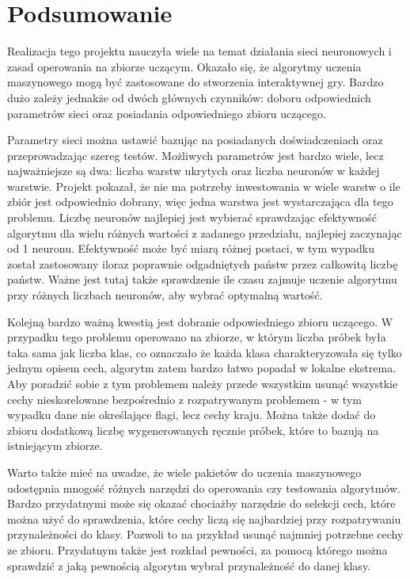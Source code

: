 \chapter{Podsumowanie}

Realizacja tego projektu nauczyła wiele na temat działania sieci neuronowych i zasad operowania na zbiorze uczącym. Okazało się, że algorytmy uczenia maszynowego mogą być zastosowane do stworzenia interaktywnej gry. Bardzo dużo zależy jednakże od dwóch głównych czynników: doboru odpowiednich parametrów sieci oraz posiadania odpowiedniego zbioru uczącego.

Parametry sieci można ustawić bazując na posiadanych doświadczeniach oraz przeprowadzając szereg testów. Możliwych parametrów jest bardzo wiele, lecz najważniejsze są dwa: liczba warstw ukrytych oraz liczba neuronów w każdej warstwie. Projekt pokazał, że nie ma potrzeby inwestowania w wiele warstw o ile zbiór jest odpowiednio dobrany, więc jedna warstwa jest wystarczająca dla tego problemu. Liczbę neuronów najlepiej jest wybierać sprawdzając efektywność algorytmu dla wielu różnych wartości z zadanego przedziału, najlepiej zaczynając od 1 neuronu. Efektywność może być miarą różnej postaci, w tym wypadku został zastosowany iloraz poprawnie odgadniętych państw przez całkowitą liczbę państw. Ważne jest tutaj także sprawdzenie ile czasu zajmuje uczenie algorytmu przy różnych liczbach neuronów, aby wybrać optymalną wartość.

Kolejną bardzo ważną kwestią jest dobranie odpowiedniego zbioru uczącego. W przypadku tego problemu operowano na zbiorze, w którym liczba próbek była taka sama jak liczba klas, co oznaczało że każda klasa charakteryzowała się tylko jednym opisem cech, algorytm zatem bardzo łatwo popadał w lokalne ekstrema. Aby poradzić sobie z tym problemem należy przede wszystkim usunąć wszystkie cechy nieskorelowane bezpośrednio z rozpatrywanym problemem - w tym wypadku dane nie określające flagi, lecz cechy kraju. Można także dodać do zbioru dodatkową liczbę wygenerowanych ręcznie próbek, które to bazują na istniejącym zbiorze.

Warto także mieć na uwadze, że wiele pakietów do uczenia maszynowego udostępnia mnogość różnych narzędzi do operowania czy testowania algorytmów. Bardzo przydatnymi może się okazać chociażby narzędzie do selekcji cech, które można użyć do sprawdzenia, które cechy liczą się najbardziej przy rozpatrywaniu przynależności do klasy. Pozwoli to na przykład usunąć najmniej potrzebne cechy ze zbioru. Przydatnym także jest rozkład pewności, za pomocą którego można sprawdzić z jaką pewnością algorytm wybrał przynależność do danej klasy.